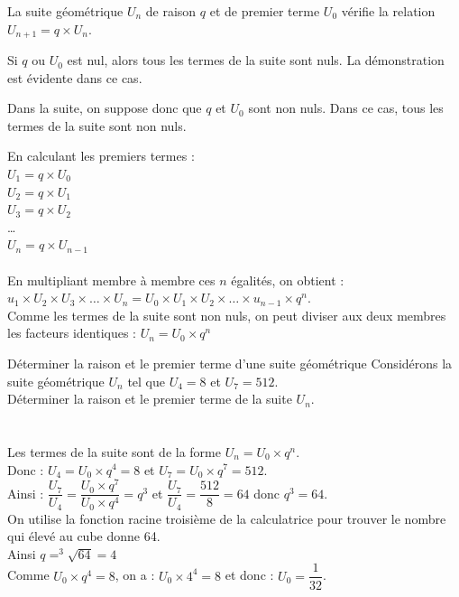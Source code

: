 \begin{bdemo}
	La suite géométrique $U_n$ de raison $q$ et de premier terme $U_0$ vérifie la relation
	$U_{n+1}=q\times U_n$.
	\begin{itemDem}
		\item Si $q$ ou $U_0$ est nul, alors tous les termes de la suite sont nuls. La démonstration est évidente dans ce cas.
		\item Dans la suite, on suppose donc que $q$ et $U_0$ sont non nuls. Dans ce cas, tous les termes de la suite sont non nuls.
	\end{itemDem}
	En calculant les premiers termes :\\ 
	$U_1=q\times U_0$\\
	$U_2=q\times U_1$\\
	$U_3=q\times U_2$\\
	…\\
	$U_n=q\times U_{n-1}$\\
	\\
	En multipliant membre à membre ces $n$ égalités, on obtient :
	$u_1\times U_2\times U_3\times …\times U_n=U_0\times U_1\times U_2\times …\times u_{n-1}\times q^n$.\\
	Comme les termes de la suite sont non nuls, on peut diviser aux deux membres les facteurs identiques : $U_n=U_0\times q^n$
\end{bdemo}

\begin{bmethodet}{Déterminer la raison et le premier terme d'une suite géométrique}
	Considérons la suite géométrique $U_n$ tel que $U_4=8$ et $U_7=512$.\\
	Déterminer la raison et le premier terme de la suite $U_n$.\\
	\\
	\ \\
	Les termes de la suite sont de la forme $U_n=U_0\times q^n$.\\
	Donc : $U_4=U_0\times q^4=8$ et $U_7=U_0\times q^7=512$.\\
	Ainsi : $\dfrac{U_7}{U_4}  = \dfrac{U_0\times q^7}{U_0\times q^4}  =q^3$ et $\dfrac{U_7}{U_4}=\dfrac{512}{8}=64$ donc $q^3=64$.\\
	On utilise la fonction racine troisième de la calculatrice pour trouver le nombre qui élevé au cube donne 64.\\
	Ainsi $q=^3\sqrt{64}=4$\\
	Comme $U_0 \times q^4=8$, on a : $U_0\times 4^4=8$ et donc : $U_0= \dfrac{1}{32}$.
\end{bmethodet}

